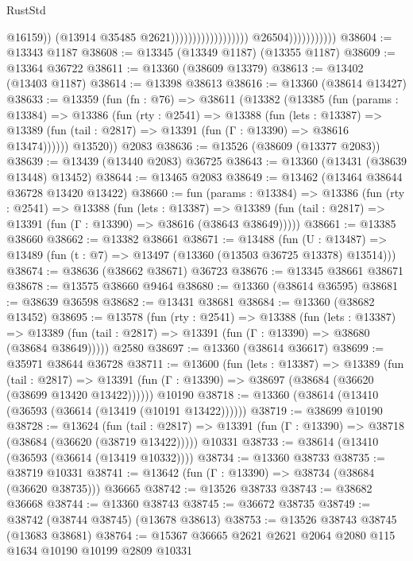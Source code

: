 \begin{lexlean}{RustStd}
\begin{coremodule}
                                                                @16159))
                                                            (@13914 @35485 @2621))))))))))))))))))
                          @26504)))))))))))
@38604 := @13343 @1187
@38608 := @13345 (@13349 @1187) (@13355 @1187)
@38609 := @13364 @36722
@38611 := @13360 (@38609 @13379)
@38613 := @13402 (@13403 @1187)
@38614 := @13398 @38613
@38616 := @13360 (@38614 @13427)
@38633 := @13359
    (fun (fn : @76) =>
    @38611
      (@13382
        (@13385
          (fun (params : @13384) =>
          @13386
            (fun (rty : @2541) =>
            @13388
              (fun (lets : @13387) =>
              @13389 (fun (tail : @2817) => @13391 (fun (Γ : @13390) => @38616 @13474))))))
        @13520))
    @2083
@38636 := @13526 (@38609 (@13377 @2083))
@38639 := @13439 (@13440 @2083) @36725
@38643 := @13360 (@13431 (@38639 @13448) @13452)
@38644 := @13465 @2083
@38649 := @13462 (@13464 @38644 @36728 @13420 @13422)
@38660 := fun (params : @13384) =>
  @13386
    (fun (rty : @2541) =>
    @13388
      (fun (lets : @13387) =>
      @13389 (fun (tail : @2817) => @13391 (fun (Γ : @13390) => @38616 (@38643 @38649)))))
@38661 := @13385 @38660
@38662 := @13382 @38661
@38671 := @13488
    (fun (U : @13487) => @13489 (fun (t : @7) => @13497 (@13360 (@13503 @36725 @13378) @13514)))
@38674 := @38636 (@38662 @38671) @36723
@38676 := @13345 @38661 @38671
@38678 := @13575 @38660 @9464
@38680 := @13360 (@38614 @36595)
@38681 := @38639 @36598
@38682 := @13431 @38681
@38684 := @13360 (@38682 @13452)
@38695 := @13578
    (fun (rty : @2541) =>
    @13388
      (fun (lets : @13387) =>
      @13389 (fun (tail : @2817) => @13391 (fun (Γ : @13390) => @38680 (@38684 @38649)))))
    @2580
@38697 := @13360 (@38614 @36617)
@38699 := @35971 @38644 @36728
@38711 := @13600
    (fun (lets : @13387) =>
    @13389
      (fun (tail : @2817) =>
      @13391 (fun (Γ : @13390) => @38697 (@38684 (@36620 (@38699 @13420 @13422))))))
    @10190
@38718 := @13360 (@38614 (@13410 (@36593 (@36614 (@13419 (@10191 @13422))))))
@38719 := @38699 @10190
@38728 := @13624
    (fun (tail : @2817) => @13391 (fun (Γ : @13390) => @38718 (@38684 (@36620 (@38719 @13422)))))
    @10331
@38733 := @38614 (@13410 (@36593 (@36614 (@13419 @10332))))
@38734 := @13360 @38733
@38735 := @38719 @10331
@38741 := @13642 (fun (Γ : @13390) => @38734 (@38684 (@36620 @38735))) @36665
@38742 := @13526 @38733
@38743 := @38682 @36668
@38744 := @13360 @38743
@38745 := @36672 @38735
@38749 := @38742 (@38744 @38745) (@13678 @38613)
@38753 := @13526 @38743 @38745 (@13683 @38681)
@38764 := @15367 @36665 @2621 @2621 @2064 @2080 @115 @1634 @10190 @10199 @2809 @10331

\end{coremodule}
\end{lexlean}

